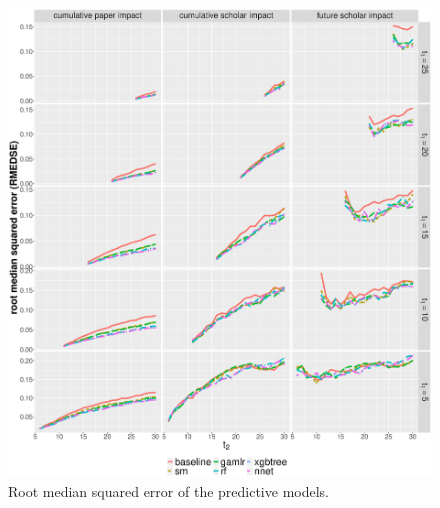 \begin{refsection}
\begin{figure}[ht!]
    \centering
    \includegraphics[width=\textwidth]{figures/pred_model/medse.eps}
    \caption[RMESE of the predictive models]{Root median squared error of the predictive models.}
    \label{fig:pred_medse}
\end{figure}


\end{refsection}
